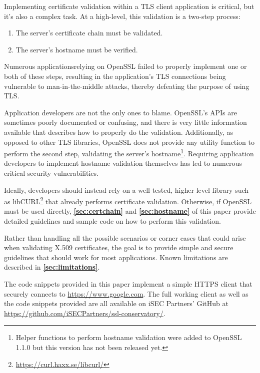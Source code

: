 \documentclass{article}
\begin{document}
Implementing certificate validation within a TLS client application is
critical, but it's also a complex task. At a high-level, this validation is
a two-step process:

\begin{enumerate}
    \item The server's certificate chain must be validated.
    \item The server's hostname must be verified.
\end{enumerate}

Numerous applications\footnotemark relying on OpenSSL failed to properly
implement one or both of these steps, resulting in the application's TLS
connections being vulnerable to man-in-the-middle attacks, thereby defeating
the purpose of using TLS.



Application developers are not the only ones to blame. OpenSSL's APIs are
sometimes poorly documented or confusing, and there is very little information
available that describes how to properly do the validation. Additionally, as
opposed to other TLS libraries, OpenSSL does not provide any utility function
to perform the second step, validating the server's hostname\footnote{Helper
functions to perform hostname validation were added to OpenSSL 1.1.0 but
this version has not been released yet.}. Requiring application developers to
implement hostname validation themselves has led to numerous critical security
vulnerabilities.

Ideally, developers should instead rely on a well-tested, higher level library
such as libCURL\footnote{\url{https://curl.haxx.se/libcurl/}} that already
performs certificate validation. Otherwise, if OpenSSL must be used directly,
\textbf{\ref{sec:certchain}} and \textbf{\ref{sec:hostname}}
of this paper provide detailed guidelines and sample code on how to perform
this validation.

Rather than handling all the possible scenarios or corner cases that could
arise when validating X.509 certificates, the goal is to provide simple and
secure guidelines that should work for most applications. Known limitations
are described in \textbf{\ref{sec:limitations}}.

The code snippets provided in this paper implement a simple HTTPS client that
securely connects to \url{https://www.google.com}. The full working client as
well as the code snippets provided are all available on iSEC Partners' GitHub
at \url{https://github.com/iSECPartners/ssl-conservatory/}.
\end{document}
